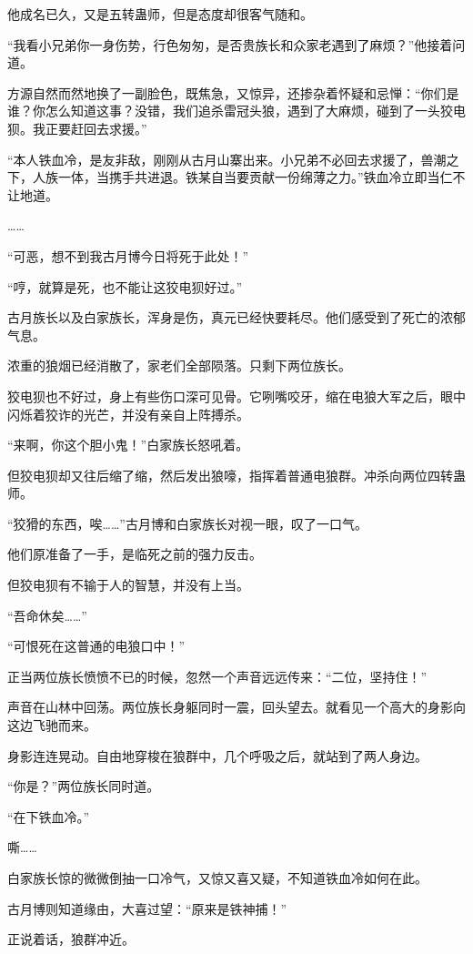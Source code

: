 \begin{this_body}
他成名已久，又是五转蛊师，但是态度却很客气随和。

“我看小兄弟你一身伤势，行色匆匆，是否贵族长和众家老遇到了麻烦？”他接着问道。

方源自然而然地换了一副脸色，既焦急，又惊异，还掺杂着怀疑和忌惮：“你们是谁？你怎么知道这事？没错，我们追杀雷冠头狼，遇到了大麻烦，碰到了一头狡电狈。我正要赶回去求援。”

“本人铁血冷，是友非敌，刚刚从古月山寨出来。小兄弟不必回去求援了，兽潮之下，人族一体，当携手共进退。铁某自当要贡献一份绵薄之力。”铁血冷立即当仁不让地道。

……

“可恶，想不到我古月博今日将死于此处！”

“哼，就算是死，也不能让这狡电狈好过。”

古月族长以及白家族长，浑身是伤，真元已经快要耗尽。他们感受到了死亡的浓郁气息。

浓重的狼烟已经消散了，家老们全部陨落。只剩下两位族长。

狡电狈也不好过，身上有些伤口深可见骨。它咧嘴咬牙，缩在电狼大军之后，眼中闪烁着狡诈的光芒，并没有亲自上阵搏杀。

“来啊，你这个胆小鬼！”白家族长怒吼着。

但狡电狈却又往后缩了缩，然后发出狼嚎，指挥着普通电狼群。冲杀向两位四转蛊师。

“狡猾的东西，唉……”古月博和白家族长对视一眼，叹了一口气。

他们原准备了一手，是临死之前的强力反击。

但狡电狈有不输于人的智慧，并没有上当。

“吾命休矣……”

“可恨死在这普通的电狼口中！”

正当两位族长愤愤不已的时候，忽然一个声音远远传来：“二位，坚持住！”

声音在山林中回荡。两位族长身躯同时一震，回头望去。就看见一个高大的身影向这边飞驰而来。

身影连连晃动。自由地穿梭在狼群中，几个呼吸之后，就站到了两人身边。

“你是？”两位族长同时道。

“在下铁血冷。”

嘶……

白家族长惊的微微倒抽一口冷气，又惊又喜又疑，不知道铁血冷如何在此。

古月博则知道缘由，大喜过望：“原来是铁神捕！”

正说着话，狼群冲近。


\end{this_body}
